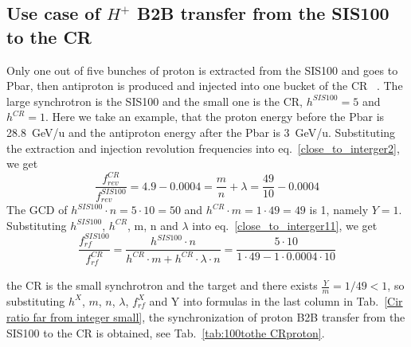 \subsection{Use case of $H^{+}$ B2B transfer from the SIS100 to the CR} 
Only one out of five bunches of proton is extracted from the SIS100 and goes to Pbar, then antiproton is produced and  injected into one bucket of the CR ~\cite{steck_demonstration_2011}. The large synchrotron is the SIS100 and the small one is the CR, $h^{\mathit{SIS100}}=5$ and $h^{\mathit{CR}}=1$. Here we take an example, that the proton energy before the Pbar is \SI{28.8}{GeV/\atomicmassunit} and the antiproton energy after the Pbar is \SI{3}{GeV/\atomicmassunit}. Substituting the extraction and injection revolution frequencies into eq.~\ref{close_to_interger2}, we get
\begin{equation} 
\frac{f_{\mathit{rev}}^{\mathit{CR}}}{f_{\mathit{rev}}^{\mathit{SIS100}}}=4.9-0.0004=\frac{m}{n}+ \lambda=\frac{49}{10}-0.0004
\end{equation}
The GCD of $h^{\mathit{SIS100}}\cdot n=5\cdot10=50$ and $h^{\mathit{CR}} \cdot m=1\cdot 49=49$ is 1, namely $Y=1$. Substituting $h^{\mathit{SIS100}}$, $h^{\mathit{CR}}$, m, n and $\lambda$ into eq.~\ref{close_to_interger11}, we get
\begin{equation} 
\frac{f_{\mathit{rf}}^{\mathit{SIS100}}}{f_{\mathit{rf}}^{\mathit{CR}}}=\frac{h^{\mathit{SIS100}}\cdot n}{h^{\mathit{CR}} \cdot m+ h^{\mathit{CR}} \cdot\lambda\cdot n}=\frac{5\cdot 10}{1 \cdot 49- 1 \cdot0.0004\cdot 10}
\end{equation}

the CR is the small synchrotron and the target and there exists $\frac{Y}{m}=1/49<1$, so substituting $h^X$, $m$, $n$, $\lambda$, $f_{\mathit{rf}}^{X}$ and Y into formulas in the last column in Tab.~\ref{Cir ratio far from integer small}, the synchronization of proton B2B transfer from the SIS100 to the CR is obtained, see Tab.~\ref{tab:100tothe CRproton}.

